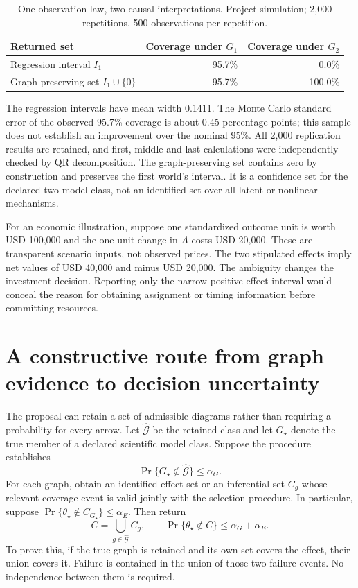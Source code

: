 \begin{table}[tbp]
\centering
\caption{One observation law, two causal interpretations. Project simulation;
 2,000 repetitions, 500 observations per repetition.}
\begin{tabular}{lrr}
\toprule
Returned set & Coverage under $G_1$ & Coverage under $G_2$\\
\midrule
Regression interval $I_1$ & 95.7\% & 0.0\%\\
Graph-preserving set $I_1\cup\{0\}$ & 95.7\% & 100.0\%\\
\bottomrule
\end{tabular}
\label{closure30:graph-coverage-table}
\end{table}

The regression intervals have mean width 0.1411. The Monte Carlo standard
error of the observed 95.7\% coverage is about 0.45 percentage points; this
sample does not establish an improvement over the nominal 95\%. All 2,000
replication results are retained, and first, middle and last calculations
were independently checked by QR decomposition. The graph-preserving set
contains zero by construction and preserves the first world's interval.
It is a confidence set for the declared two-model class, not an identified
set over all latent or nonlinear mechanisms.

For an economic illustration, suppose one standardized outcome unit is worth
USD 100,000 and the one-unit change in $A$ costs USD 20,000. These are
transparent scenario inputs, not observed prices. The two stipulated effects
imply net values of USD 40,000 and minus USD 20,000. The ambiguity changes
the investment decision. Reporting only the narrow positive-effect interval
would conceal the reason for obtaining assignment or timing information
before committing resources.

\section{A constructive route from graph evidence to decision uncertainty}

The proposal can retain a set of admissible diagrams rather than requiring a
probability for every arrow. Let $\widehat{\mathcal G}$ be the retained class
and let $G_\star$ denote the true member of a declared scientific model class.
Suppose the procedure establishes
\begin{equation}
 \Pr\{G_\star\notin\widehat{\mathcal G}\}\leq\alpha_G.
 \label{closure30:graph-retention-contract}
\end{equation}
For each graph, obtain an identified effect set or an inferential set
$C_g$ whose relevant coverage event is valid jointly with the selection
procedure. In particular, suppose
$\Pr\{\theta_\star\notin C_{G_\star}\}\leq\alpha_E$.
Then return
\begin{equation}
 C=\bigcup_{g\in\widehat{\mathcal G}} C_g,
 \qquad
 \Pr\{\theta_\star\notin C\}\leq\alpha_G+\alpha_E.
 \label{closure30:union-coverage}
\end{equation}
To prove this, if the true graph is retained and its own set covers the
effect, their union covers it. Failure is contained in the union of those
two failure events. No independence between them is required.

